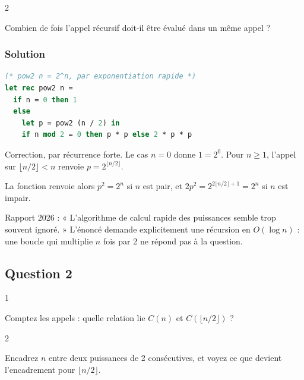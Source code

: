 \documentclass[11pt,a4paper]{article}
\begin{document}
\begin{indication}{2}

Combien de fois l'appel récursif doit-il être évalué dans un même appel ?

\end{indication}

\hypertarget{solution}{%
\subsubsection{Solution}\label{solution}}

\begin{lstlisting}[language=Caml]
(* pow2 n = 2^n, par exponentiation rapide *)
let rec pow2 n =
  if n = 0 then 1
  else
    let p = pow2 (n / 2) in
    if n mod 2 = 0 then p * p else 2 * p * p
\end{lstlisting}

Correction, par récurrence forte. Le cas \(n=0\) donne \(1=2^0\). Pour \(n\ge1\), l'appel sur \(\lfloor n/2\rfloor<n\) renvoie \(p=2^{\lfloor n/2\rfloor}\).

La fonction renvoie alors \(p^2=2^n\) si \(n\) est pair, et \(2p^2=2^{2\lfloor n/2\rfloor+1}=2^n\) si \(n\) est impair.

\begin{jury}

Rapport 2026 : « L'algorithme de calcul rapide des puissances semble trop souvent ignoré. » L'énoncé demande explicitement une récursion en \(O(\log n)\) : une boucle qui multiplie \(n\) fois par 2 ne répond pas à la question.

\end{jury}

\hypertarget{question-2}{%
\subsection{Question 2}\label{question-2}}

\begin{indication}{1}

Comptez les appels : quelle relation lie \(C(n)\) et \(C(\lfloor n/2\rfloor)\) ?

\end{indication}

\begin{indication}{2}

Encadrez \(n\) entre deux puissances de 2 consécutives, et voyez ce que devient l'encadrement pour \(\lfloor n/2\rfloor\).

\end{indication}
\end{document}
